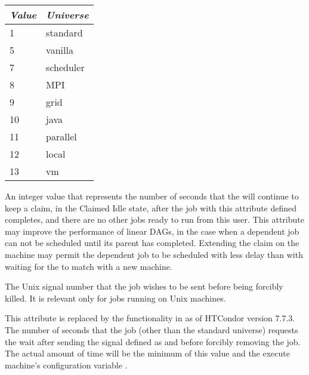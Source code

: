 \begin{description}
\begin{center}
\begin{table}[hbt]
\begin{tabular}{|p{2cm}p{3cm}|} \hline
\emph{Value} & \emph{Universe} \\ \hline \hline
1 & standard \\ \hline
5 & vanilla \\ \hline
7 & scheduler \\ \hline
8 & MPI \\ \hline
9 & grid \\ \hline
10 & java \\ \hline
11 & parallel \\ \hline
12 & local \\ \hline
13 & vm \\ \hline
\end{tabular}
\end{table}
\end{center}

\item[\AdAttr{KeepClaimIdle}:]  An integer value that represents the number
of seconds that the  will continue to keep a claim,
in the Claimed Idle state,
after the job with this attribute defined completes, 
and there are no other jobs ready to run from this user.
This attribute may improve the performance of linear DAGs,
in the case when a dependent job can not be scheduled until its
parent has completed.
Extending the claim on the machine may permit the dependent job to be
scheduled with less delay than with waiting for the 
to match with a new machine. 

\item[\AdAttr{KillSig}:]  The Unix signal number that the job wishes to be
sent before being forcibly killed.
It is relevant only for jobs running on Unix machines.

\item[\AdAttr{KillSigTimeout}:]  This attribute is replaced by the
functionality in  as of HTCondor version 7.7.3.
The number of seconds that the job
(other than the standard universe) requests the  wait
after sending the signal defined as  and before forcibly
removing the job.
The actual amount of time will be the minimum of this value
and the execute machine's configuration variable .


\end{description}
